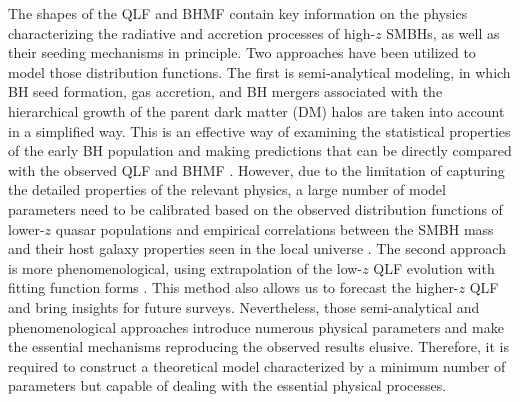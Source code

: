 \documentclass[twocolumn, twocolappendix]{aastex63}
\begin{document}
\begin{CJK*}{UTF8}{gbsn}
The shapes of the QLF and BHMF contain key information on the physics characterizing the radiative 
and accretion processes of high-$z$ SMBHs, as well as their seeding mechanisms in principle.
Two approaches have been utilized to model those distribution functions.  
The first is semi-analytical modeling, in which BH seed formation, gas accretion, and BH mergers associated 
with the hierarchical growth of the parent dark matter (DM) halos are taken into account in a simplified way. 
This is an effective way of examining the statistical properties of the early BH population and making predictions 
that can be directly compared with the observed QLF and BHMF
\citep[e.g.,][]{1998ApJ...503..505H,2010ApJ...718..231S,2018MNRAS.474.1995R,2018MNRAS.481.3278R,
2021MNRAS.508.2706Y,2021ApJ...910L..11K,2022MNRAS.511..616T,2022arXiv220714689O}. 
However, due to the limitation of capturing the detailed properties of the relevant physics, 
a large number of model parameters need to be calibrated based on the observed distribution functions 
of lower-$z$ quasar populations \citep[e.g.,][]{2007ApJ...669...45H}
and empirical correlations between the SMBH mass and their host galaxy properties seen
in the local universe \citep{2013ARA&A..51..511K}.
The second approach is more phenomenological, using extrapolation of the low-$z$ QLF evolution with 
fitting function forms \citep[e.g.,][]{2019MNRAS.488.1035K,2020MNRAS.495.3252S,2022ApJ...938...25F}.
This method also allows us to forecast the higher-$z$ QLF and bring insights for future surveys.
Nevertheless, those semi-analytical and phenomenological approaches introduce numerous physical parameters
and make the essential mechanisms reproducing the observed results elusive.
Therefore, it is required to construct a theoretical model characterized by a minimum number of parameters
but capable of dealing with the essential physical processes.



\end{CJK*}
\end{document}
